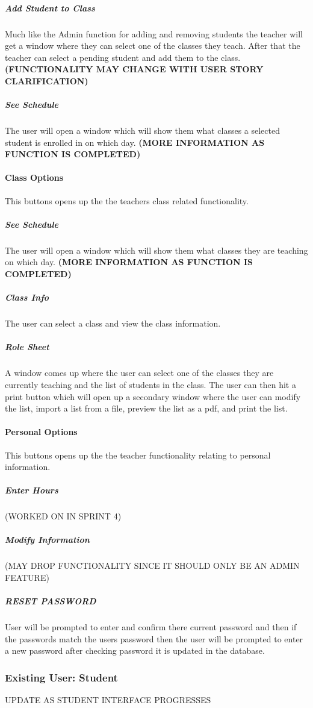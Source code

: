 \subparagraph{Add Student to Class}
\textmd{Much like the Admin function for adding and removing students the teacher will get a window where they can select one of the classes they teach. After that the teacher can select a pending student and add them to the class.}
\bf(FUNCTIONALITY MAY CHANGE WITH USER STORY CLARIFICATION)

\subparagraph{See Schedule}
\textmd{The user will open a window which will show them what classes a selected student is enrolled in on which day.}
\bf (MORE INFORMATION AS FUNCTION IS COMPLETED)

\paragraph{Class Options}
\textmd{This buttons opens up the the teachers class related functionality.}

\subparagraph{See Schedule}
\textmd{The user will open a window which will show them what classes they are teaching on which day.}
\bf (MORE INFORMATION AS FUNCTION IS COMPLETED)

\subparagraph{Class Info}
\textmd{The user can select a class and view the class information.}

\subparagraph{Role Sheet}
\textmd{A window comes up where the user can select one of the classes they are currently teaching and the list of students in the class. The user can then hit a print button which will open up a secondary window where the user can modify the list, import a list from a file, preview the list as a pdf, and print the list.}

\paragraph{Personal Options}
\textmd{This buttons opens up the the teacher functionality relating to personal information.}

\subparagraph{Enter Hours}
(WORKED ON IN SPRINT 4)

\subparagraph{Modify Information}
(MAY DROP FUNCTIONALITY SINCE IT SHOULD ONLY BE AN ADMIN FEATURE)

\subparagraph{RESET PASSWORD}
\textmd{User will be prompted to enter and confirm there current password and then if the passwords match the users password then the user will be prompted to enter a new password after checking password it is updated in the database.}

\subsubsection{Existing User: Student}
\textmd{UPDATE AS STUDENT INTERFACE PROGRESSES}


